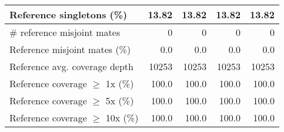 \documentclass[12pt,a4paper]{article}
\begin{document}
\begin{table}[ht]
\begin{center}
\begin{tabular}{|l*{4}{|r}|}
Reference singletons (\%) & 13.82 & 13.82 & 13.82 & 13.82 \\ \hline
\# reference misjoint mates & 0 & 0 & 0 & 0 \\ \hline
Reference misjoint mates (\%) & 0.0 & 0.0 & 0.0 & 0.0 \\ \hline
Reference avg. coverage depth & 10253 & 10253 & 10253 & 10253 \\ \hline
Reference coverage $\geq$ 1x (\%) & 100.0 & 100.0 & 100.0 & 100.0 \\ \hline
Reference coverage $\geq$ 5x (\%) & 100.0 & 100.0 & 100.0 & 100.0 \\ \hline
Reference coverage $\geq$ 10x (\%) & 100.0 & 100.0 & 100.0 & 100.0 \\ \hline
\end{tabular}
\end{center}
\end{table}
\end{document}
